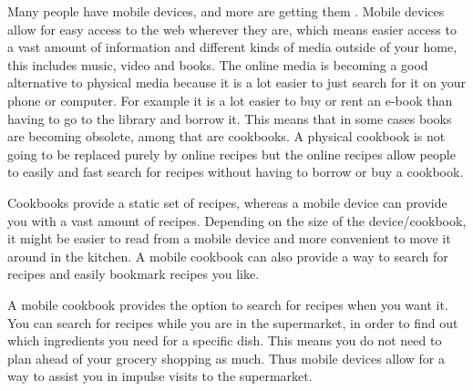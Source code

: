 Many people have mobile devices, and more are getting them . Mobile devices allow for easy access to the web wherever they are, which means easier access to a vast amount of information and different kinds of media outside of your home, this includes music, video and books. The online media is becoming a good alternative to physical media because it is a lot easier to just search for it on your phone or computer. For example it is a lot easier to buy or rent an e-book than having to go to the library and borrow it. This means that in some cases books are becoming obsolete, among that are cookbooks. A physical cookbook is not going to be replaced purely by online recipes but the online recipes allow people to easily and fast search for recipes without having to borrow or buy a cookbook.

Cookbooks provide a static set of recipes, whereas a mobile device can provide you with a vast amount of recipes. Depending on the size of the device/cookbook, it might be easier to read from a mobile device and more convenient to move it around in the kitchen. A mobile cookbook can also provide a way to search for recipes and easily bookmark recipes you like.

A mobile cookbook provides the option to search for recipes when you want it. You can search for recipes while you are in the supermarket, in order to find out which ingredients you need for a specific dish. This means you do not need to plan ahead of your grocery shopping as much. Thus mobile devices allow for a way to assist you in impulse visits to the supermarket.
